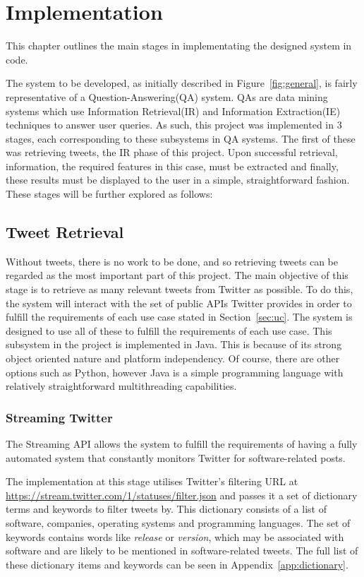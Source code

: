 \chapter{Implementation}
\label{cha:impl}
This chapter outlines the main stages in implementating the designed system in code.


The system to be developed, as initially described in Figure~\ref{fig:general}, is fairly representative of a Question-Answering(QA) system. QAs are data mining systems which use Information Retrieval(IR) and Information Extraction(IE) techniques to answer user queries. As such, this project was implemented in 3 stages, each corresponding to these subsystems in QA systems. The first of these was retrieving tweets, the IR phase of this project. Upon successful retrieval, information, the required features in this case, must be extracted and finally, these results must be displayed to the user in a simple, straightforward fashion. These stages will be further explored as follows:

\section{Tweet Retrieval}
Without tweets, there is no work to be done, and so retrieving tweets can be regarded as the most important part of this project. The main objective of this stage is to retrieve as many relevant tweets from Twitter as possible. To do this, the system will interact with the set of public APIs Twitter provides in order to fulfill the requirements of each use case stated in Section~\ref{sec:uc}. The system is designed to use all of these to fulfill the requirements of each use case. This subsystem in the project is implemented in Java. This is because of its strong object oriented nature and platform independency. Of course, there are other options such as Python, however Java is a simple programming language with relatively straightforward multithreading capabilities.

\subsection{Streaming Twitter}
The Streaming API allows the system to fulfill the requirements of having a fully automated system that constantly monitors Twitter for software-related posts. 

The implementation at this stage utilises Twitter's filtering URL at \url{https://stream.twitter.com/1/statuses/filter.json} and passes it a set of dictionary terms and keywords to filter tweets by. This dictionary consists of a list of software, companies, operating systems and programming languages. The set of keywords contains words like \emph{release} or \emph{version}, which may be associated with software and are likely to be mentioned in software-related tweets. The full list of these dictionary items and keywords can be seen in Appendix~\ref{app:dictionary}.


